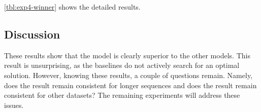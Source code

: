 \documentclass[./../../paper.tex]{subfiles}
\begin{document}
\autoref{tbl:exp4-winner} shows the detailed results.




\subsection{Discussion}
These results show that the model  is clearly superior to the other models. This result is unsurprising, as the baselines do not actively search for an optimal solution. However, knowing these results, a couple of questions remain. Namely, does the result remain consistent for longer sequences and does the result remain consistent for other datasets?  The remaining experiments will address these issues. 
\end{document}
